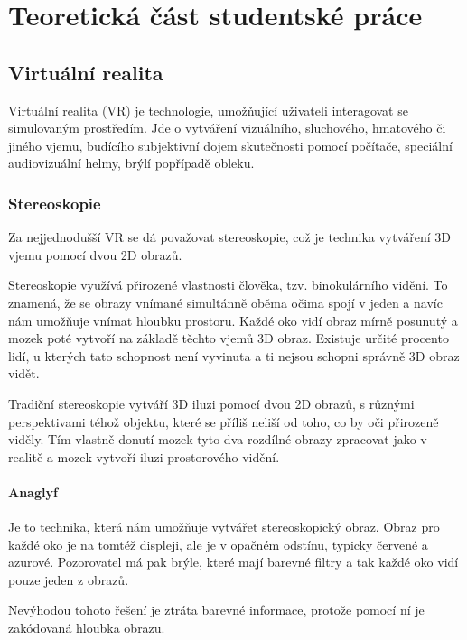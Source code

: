 \chapter{Teoretická část studentské práce}

\section{Virtuální realita}

Virtuální realita (VR) je technologie, umožňující uživateli interagovat se simulovaným prostředím. Jde o vytváření vizuálního, sluchového, hmatového či jiného vjemu, budícího subjektivní dojem skutečnosti pomocí počítače, speciální audiovizuální helmy, brýlí popřípadě obleku.

\subsection{Stereoskopie}

Za nejjednodušší VR se dá považovat stereoskopie, což je technika vytváření 3D vjemu pomocí dvou 2D obrazů.


Stereoskopie využívá přirozené vlastnosti člověka, tzv. binokulárního vidění. To znamená, že se obrazy vnímané simultánně oběma očima spojí v jeden a navíc nám umožňuje vnímat hloubku prostoru. Každé oko vidí obraz mírně posunutý a mozek poté vytvoří na základě těchto vjemů 3D obraz. Existuje určité procento lidí, u kterých tato schopnost není vyvinuta a ti nejsou schopni správně 3D obraz vidět.


Tradiční stereoskopie vytváří 3D iluzi pomocí dvou 2D obrazů, s různými perspektivami téhož objektu, které se příliš neliší od toho, co by oči přirozeně viděly. Tím vlastně donutí mozek tyto dva rozdílné obrazy zpracovat jako v realitě a mozek vytvoří iluzi prostorového vidění.




\subsubsection{Anaglyf}

Je to technika, která nám umožňuje vytvářet stereoskopický obraz. Obraz pro každé oko je na tomtéž displeji, ale je v opačném odstínu, typicky červené a azurové. Pozorovatel má pak brýle, které mají barevné filtry a tak každé oko vidí pouze jeden z obrazů.

Nevýhodou tohoto řešení je ztráta barevné informace, protože pomocí ní je zakódovaná hloubka obrazu.

